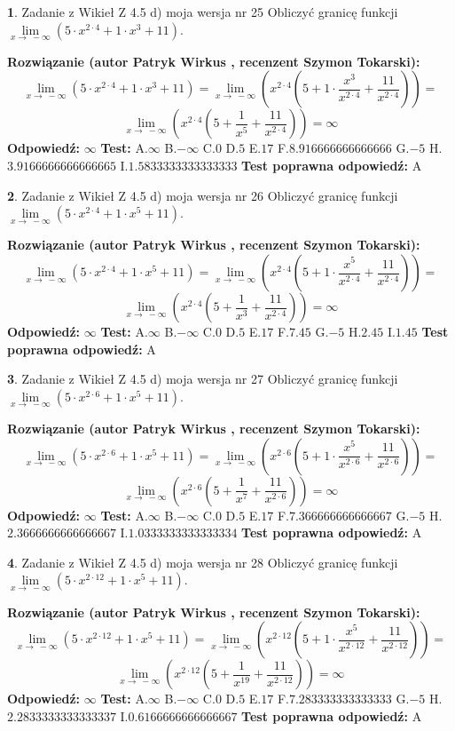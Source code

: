 \documentclass[12pt, a4paper]{article}
\theoremstyle{definition} %
\newtheorem{zad}{}
\newcommand{\zadStart}[1]{\begin{zad}#1\newline}
\newcommand{\zadStop}{\end{zad}}
\newcommand{\rozwStart}[2]{\noindent \textbf{Rozwiązanie (autor #1 , recenzent #2): }\newline}
\newcommand{\rozwStop}{\newline}
\newcommand{\odpStart}{\noindent \textbf{Odpowiedź:}\newline}
\newcommand{\odpStop}{\newline}
\newcommand{\testStart}{\noindent \textbf{Test:}\newline}
\newcommand{\testStop}{\newline}
\newcommand{\kluczStart}{\noindent \textbf{Test poprawna odpowiedź:}\newline}
\newcommand{\kluczStop}{\newline}
\begin{document}
\zadStart{Zadanie z Wikieł Z 4.5 d) moja wersja nr 25}
Obliczyć granicę funkcji  $\lim\limits_{x\to\ -\infty}(5 \cdot x^{2\cdot4}+1 \cdot x^{3}+11)$.
\zadStop
\rozwStart{Patryk Wirkus}{Szymon Tokarski}
$$\lim\limits_{x\to\ -\infty}(5 \cdot x^{2\cdot4}+1 \cdot x^{3}+11) = \lim\limits_{x\to\ -\infty}(x^{2\cdot4}(5 +1 \cdot \frac{x^{3}}{x^{2\cdot4}}+\frac{11}{x^{2\cdot4}})) =$$ $$\lim\limits_{x\to\ -\infty}(x^{2\cdot4}(5 +\frac{1}{x^{5}}+\frac{11}{x^{2\cdot4}})) =\infty$$
\rozwStop
\odpStart
$\infty$
\odpStop
\testStart
A.$\infty$ B.$-\infty$ C.$0$ D.$5$ E.$17$
F.$8.916666666666666$ G.$-5$
H.$3.9166666666666665$
I.$1.5833333333333333$
\testStop
\kluczStart
A
\kluczStop



\zadStart{Zadanie z Wikieł Z 4.5 d) moja wersja nr 26}
Obliczyć granicę funkcji  $\lim\limits_{x\to\ -\infty}(5 \cdot x^{2\cdot4}+1 \cdot x^{5}+11)$.
\zadStop
\rozwStart{Patryk Wirkus}{Szymon Tokarski}
$$\lim\limits_{x\to\ -\infty}(5 \cdot x^{2\cdot4}+1 \cdot x^{5}+11) = \lim\limits_{x\to\ -\infty}(x^{2\cdot4}(5 +1 \cdot \frac{x^{5}}{x^{2\cdot4}}+\frac{11}{x^{2\cdot4}})) =$$ $$\lim\limits_{x\to\ -\infty}(x^{2\cdot4}(5 +\frac{1}{x^{3}}+\frac{11}{x^{2\cdot4}})) =\infty$$
\rozwStop
\odpStart
$\infty$
\odpStop
\testStart
A.$\infty$ B.$-\infty$ C.$0$ D.$5$ E.$17$
F.$7.45$ G.$-5$
H.$2.45$
I.$1.45$
\testStop
\kluczStart
A
\kluczStop



\zadStart{Zadanie z Wikieł Z 4.5 d) moja wersja nr 27}
Obliczyć granicę funkcji  $\lim\limits_{x\to\ -\infty}(5 \cdot x^{2\cdot6}+1 \cdot x^{5}+11)$.
\zadStop
\rozwStart{Patryk Wirkus}{Szymon Tokarski}
$$\lim\limits_{x\to\ -\infty}(5 \cdot x^{2\cdot6}+1 \cdot x^{5}+11) = \lim\limits_{x\to\ -\infty}(x^{2\cdot6}(5 +1 \cdot \frac{x^{5}}{x^{2\cdot6}}+\frac{11}{x^{2\cdot6}})) =$$ $$\lim\limits_{x\to\ -\infty}(x^{2\cdot6}(5 +\frac{1}{x^{7}}+\frac{11}{x^{2\cdot6}})) =\infty$$
\rozwStop
\odpStart
$\infty$
\odpStop
\testStart
A.$\infty$ B.$-\infty$ C.$0$ D.$5$ E.$17$
F.$7.366666666666667$ G.$-5$
H.$2.3666666666666667$
I.$1.0333333333333334$
\testStop
\kluczStart
A
\kluczStop



\zadStart{Zadanie z Wikieł Z 4.5 d) moja wersja nr 28}
Obliczyć granicę funkcji  $\lim\limits_{x\to\ -\infty}(5 \cdot x^{2\cdot12}+1 \cdot x^{5}+11)$.
\zadStop
\rozwStart{Patryk Wirkus}{Szymon Tokarski}
$$\lim\limits_{x\to\ -\infty}(5 \cdot x^{2\cdot12}+1 \cdot x^{5}+11) = \lim\limits_{x\to\ -\infty}(x^{2\cdot12}(5 +1 \cdot \frac{x^{5}}{x^{2\cdot12}}+\frac{11}{x^{2\cdot12}})) =$$ $$\lim\limits_{x\to\ -\infty}(x^{2\cdot12}(5 +\frac{1}{x^{19}}+\frac{11}{x^{2\cdot12}})) =\infty$$
\rozwStop
\odpStart
$\infty$
\odpStop
\testStart
A.$\infty$ B.$-\infty$ C.$0$ D.$5$ E.$17$
F.$7.283333333333333$ G.$-5$
H.$2.2833333333333337$
I.$0.6166666666666667$
\testStop
\kluczStart
A
\kluczStop
\end{document}
